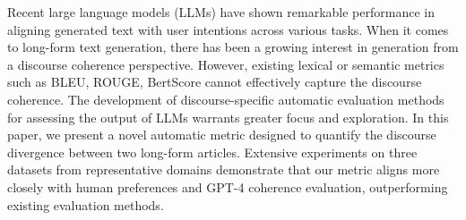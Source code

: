 Recent large language models (LLMs) have shown remarkable performance in aligning generated text with user intentions across various tasks.  When it comes to long-form text generation, there has been a growing interest in generation from a discourse coherence perspective. However, existing lexical or semantic metrics such as BLEU, ROUGE, BertScore cannot effectively capture the discourse coherence. The development of discourse-specific automatic evaluation methods for assessing the output of LLMs warrants greater focus and exploration.  In this paper, we present a novel automatic metric designed to quantify the discourse divergence between two long-form articles. Extensive experiments on three datasets from representative domains demonstrate that our metric aligns more closely with human preferences and GPT-4 coherence evaluation, outperforming existing evaluation methods.